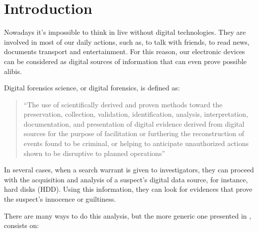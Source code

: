 \cleardoublepage
{}
\chapter*{Introduction}

Nowadays it's impossible to think in live without digital technologies. They
are involved in most of our daily actions, such as, to talk with friends, to
read news, documents transport and entertainment. For this reason, our
electronic devices can be considered as digital sources of information that
can even prove possible alibis.

Digital forensics science, or digital forensics, is defined as:

\begin{quote}
“The use of scientifically derived and proven methods toward the preservation,
collection, validation, identification, analysis, interpretation,
documentation, and presentation of digital evidence derived from digital
sources for the purpose of facilitation or furthering the reconstruction of
events found to be criminal, or helping to anticipate unauthorized actions
shown to be disruptive to planned operations” \cite{DFRWS-df-road-map}
\end{quote}

In several cases, when a search warrant is given to investigators, they can
proceed with the acquisition and analysis of a suspect's digital data source,
for instance, hard disks (HDD). Using this information, they can look for
evidences that prove the suspect's innocence or guiltiness.

There are many ways to do this analysis, but the more generic one presented in
\cite{ds-phases}, consists on:

